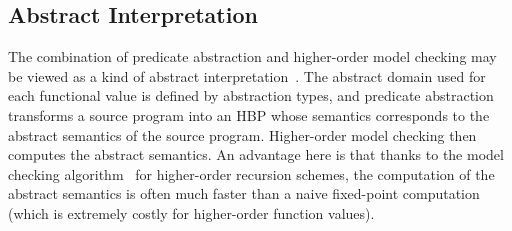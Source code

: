 \subsection{Abstract Interpretation}
The combination of predicate abstraction and higher-order model checking 
may be viewed as a kind of abstract interpretation~\cite{Cousot1978}. 
The abstract domain used for each functional value is defined by 
abstraction types, and predicate abstraction transforms a source program 
into an HBP whose semantics corresponds to the abstract semantics of the 
source program. Higher-order model checking then computes the abstract 
semantics. An advantage here is that thanks to the model checking 
algorithm~\cite{Kobayashi2009c} for higher-order recursion schemes, the 
computation of the abstract semantics is often much faster than a naive 
fixed-point computation (which is extremely costly for higher-order 
function values).
